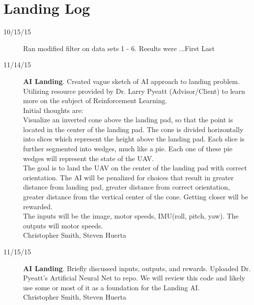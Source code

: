 \section{Landing Log}

\begin{description}
\item [10/15/15]  Ran modified filter on data sets 1 - 6.  Results were ...\hfill{First Last}

\item [11/14/15] \textbf{AI Landing}. Created vague sketch of AI approach to landing problem. Utilizing resource provided by Dr. Larry Pyeatt (Advisor/Client) to learn more on the subject of Reinforcement Learning. \\
Initial thoughts are:\\
Visualize an inverted cone above the landing pad, so that the point is located in the center of the landing pad. The cone is divided horizontally into slices which represent the height above the landing pad. Each slice is further segmented into wedges, much like a pie. Each one of these pie wedges will represent the state of the UAV. \\
The goal is to land the UAV on the center of the landing pad with correct orientation. The AI will be penalized for choices that result in greater distance from landing pad, greater distance from correct orientation, greater distance from the vertical center of the cone. Getting closer will be rewarded.\\
The inputs will be the image, motor speeds, IMU(roll, pitch, yaw). The outputs will motor speeds.\\

\hfill{Christopher Smith, Steven Huerta}

\item [11/15/15] \textbf{AI Landing}. Briefly discussed inputs, outputs, and rewards. Uploaded Dr. Pyeatt's Artificial Neural Net to repo. We will review this code and likely use some or most of it as a foundation for the Landing AI.\\

\hfill{Christopher Smith, Steven Huerta}

\end{description}
